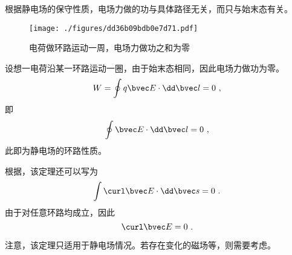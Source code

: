 

根据静电场的保守性质，电场力做的功与具体路径无关，而只与始末态有关。
\begin{figure}[ht]
\centering
\texttt{[image: ./figures/dd36b09bdb0e7d71.pdf]}
\caption{电荷做环路运动一周，电场力做功之和为零} \label{fig_ELECLD_1}
\end{figure}

设想一电荷沿某一环路运动一圈，由于始末态相同，因此电场力做功为零。
$$
W = \oint q\bvec E \cdot \dd \bvec l = 0~,
$$
即
\begin{equation}
\oint \bvec E \cdot \dd \bvec l = 0~,
\end{equation}
此即为静电场的环路性质。

根据，该定理还可以写为
$$\int \curl \bvec E \cdot \dd \bvec s = 0~.$$
由于对任意环路均成立，因此
\begin{equation}
\curl \bvec E = 0~.
\end{equation}

注意，该定理只适用于静电场情况。若存在变化的磁场等，则需要考虑。

